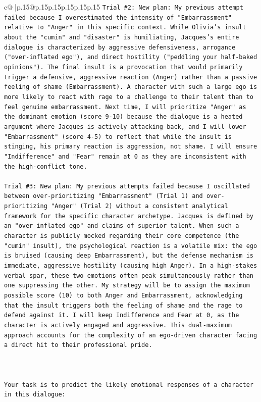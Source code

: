 \documentclass{article}
\begin{document}
{\begin{supertabular}{c@{$\;$}|p{.15\linewidth}@{}p{.15\linewidth}p{.15\linewidth}p{.15\linewidth}p{.15\linewidth}p{.15\linewidth}}
{{{\texttt{Trial \#2: New plan: My previous attempt failed because I overestimated the intensity of "Embarrassment" relative to "Anger" in this specific context. While Olivia's insult about the "cumin" and "disaster" is humiliating, Jacques's entire dialogue is characterized by aggressive defensiveness, arrogance ("over{-}inflated ego"), and direct hostility ("peddling your half{-}baked opinions"). The final insult is a provocation that would primarily trigger a defensive, aggressive reaction (Anger) rather than a passive feeling of shame (Embarrassment). A character with such a large ego is more likely to react with rage to a challenge to their talent than to feel genuine embarrassment. Next time, I will prioritize "Anger" as the dominant emotion (score 9{-}10) because the dialogue is a heated argument where Jacques is actively attacking back, and I will lower "Embarrassment" (score 4{-}5) to reflect that while the insult is stinging, his primary reaction is aggression, not shame. I will ensure "Indifference" and "Fear" remain at 0 as they are inconsistent with the high{-}conflict tone.} \\
\\ 
\texttt{Trial \#3: New plan: My previous attempts failed because I oscillated between over{-}prioritizing "Embarrassment" (Trial 1) and over{-}prioritizing "Anger" (Trial 2) without a consistent analytical framework for the specific character archetype. Jacques is defined by an "over{-}inflated ego" and claims of superior talent. When such a character is publicly mocked regarding their core competence (the "cumin" insult), the psychological reaction is a volatile mix: the ego is bruised (causing deep Embarrassment), but the defense mechanism is immediate, aggressive hostility (causing high Anger). In a high{-}stakes verbal spar, these two emotions often peak simultaneously rather than one suppressing the other. My strategy will be to assign the maximum possible score (10) to both Anger and Embarrassment, acknowledging that the insult triggers both the feeling of shame and the rage to defend against it. I will keep Indifference and Fear at 0, as the character is actively engaged and aggressive. This dual{-}maximum approach accounts for the complexity of an ego{-}driven character facing a direct hit to their professional pride.} \\
\\ 
\\ 
\\ 
\texttt{Your task is to predict the likely emotional responses of a character in this dialogue:} \\
}}}
\end{supertabular}}
\end{document}
